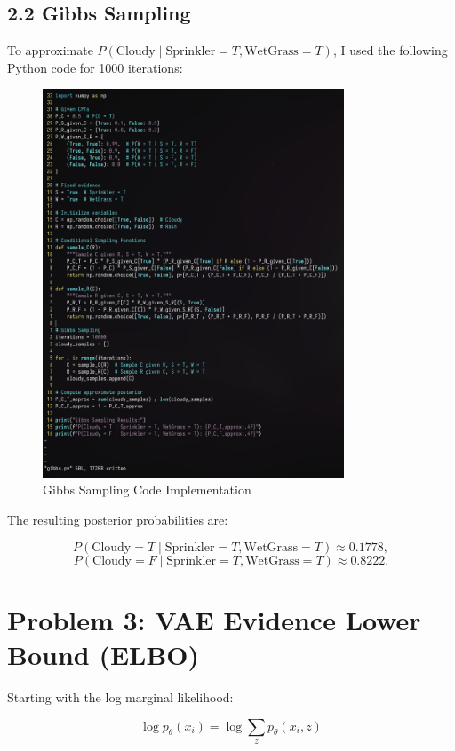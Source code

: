 \documentclass[11pt]{article}
\begin{document}
\subsection*{2.2 Gibbs Sampling}

To approximate \( P(\text{Cloudy} \mid \text{Sprinkler} = T, \text{WetGrass} = T) \), I used the following Python code for 1000 iterations:

\begin{figure}[H]
    \centering
    \includegraphics[width=0.8\textwidth]{ss.png}
    \caption{Gibbs Sampling Code Implementation}
\end{figure}

The resulting posterior probabilities are:

\[
P(\text{Cloudy} = T \mid \text{Sprinkler} = T, \text{WetGrass} = T) \approx 0.1778,
\]
\[
P(\text{Cloudy} = F \mid \text{Sprinkler} = T, \text{WetGrass} = T) \approx 0.8222.
\]

\section*{Problem 3: VAE Evidence Lower Bound (ELBO)}

Starting with the log marginal likelihood:

\[

\log p_\theta(x_i) = \log \sum_z p_\theta(x_i, z)
\]
\end{document}
